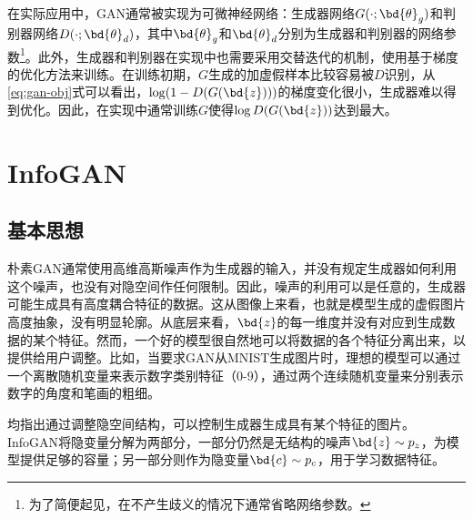 在实际应用中，GAN通常被实现为可微神经网络：生成器网络$G(\cdot; \bd{\theta}_g)$和判别器网络$D(\cdot; \bd{\theta}_d)$，其中$\bd{\theta}_g$和$\bd{\theta}_d$分别为生成器和判别器的网络参数\footnote{为了简便起见，在不产生歧义的情况下通常省略网络参数。}。此外，生成器和判别器在实现中也需要采用交替迭代的机制，使用基于梯度的优化方法来训练。在训练初期，$G$生成的加虚假样本比较容易被$D$识别，从\eqref{eq:gan-obj}式可以看出，$\log(1 - D(G(\bd{z})))$的梯度变化很小，生成器难以得到优化。因此，在实现中通常训练$G$使得$\log D(G(\bd{z}))$达到最大。

\section{InfoGAN}\label{sec:infogan}
\subsection{基本思想}
朴素GAN通常使用高维高斯噪声作为生成器的输入，并没有规定生成器如何利用这个噪声，也没有对隐空间作任何限制。因此，噪声的利用可以是任意的，生成器可能生成具有高度耦合特征的数据。这从图像上来看，也就是模型生成的虚假图片高度抽象，没有明显轮廓。从底层来看，$\bd{z}$的每一维度并没有对应到生成数据的某个特征。然而，一个好的模型很自然地可以将数据的各个特征分离出来，以提供给用户调整。比如，当要求GAN从MNIST\citep{lecun1989backpropagation}生成图片时，理想的模型可以通过一个离散随机变量来表示数字类别特征（0-9），通过两个连续随机变量来分别表示数字的角度和笔画的粗细。

\citet{mirza2014conditional,odena2017conditional,miyato2018cgans}均指出通过调整隐空间结构，可以控制生成器生成具有某个特征的图片。InfoGAN\citep{chen2016infogan}将隐变量分解为两部分，一部分仍然是无结构的噪声$\bd{z} \sim p_z$，为模型提供足够的容量；另一部分则作为隐变量$\bd{c} \sim p_c$，用于学习数据特征。

